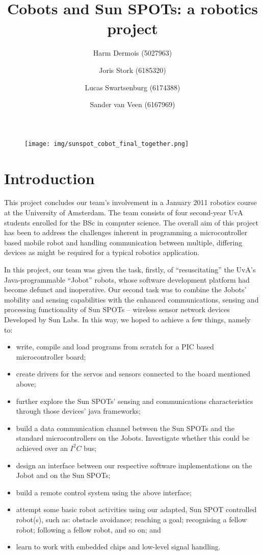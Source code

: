 \documentclass[a4paper,10pt]{article} %
\author{Harm Dermois (5027963) \and Joris Stork (6185320) \and
Lucas Swartsenburg (6174388) \and Sander van Veen (6167969)}
\title{Cobots and Sun SPOTs: a robotics project}
\begin{document}
\maketitle

\abstract{}

\begin{figure}[H]
    \label{fig:cobot_sunspot_final}
    \centering
    \texttt{[image: img/sunspot\_cobot\_final\_together.png]}
\end{figure}

\pagebreak

\tableofcontents

\pagebreak

\section{Introduction} %

This project concludes our team's involvement in a January 2011 robotics course
at the University of Amsterdam. The team consists of four second-year UvA
students enrolled for the BSc in computer science. The overall aim of this
project has been to address the challenges inherent in programming a
microcontroller based mobile robot and handling communication between multiple,
differing devices as might be required for a typical robotics application.

In this project, our team was given the task, firstly, of ``resuscitating'' the
UvA's Java-programmable ``Jobot'' robots, whose software development platform
had become defunct and inoperative. Our second task was to combine the Jobots'
mobility and sensing capabilities with the enhanced communications, sensing and
processing functionality of Sun SPOTs -- wireless sensor network devices
Developed by Sun Labs. In this way, we hoped to achieve a few things, namely to:

\begin{itemize}
    \item write, compile and load programs from scratch for a PIC based
    microcontroller board;
    \item create drivers for the servos and sensors connected to the board
    mentioned above;
    \item further explore the Sun SPOTs' sensing and communications
    characteristics through those devices' java frameworks;
    \item build a data communication channel between the Sun SPOTs and the
    standard microcontrollers on the Jobots. Investigate whether this could be
    achieved over an $I^2C$ bus;
    \item design an interface between our respective software implementations on
    the Jobot and on the Sun SPOTs;
    \item build a remote control system using the above interface;
    \item attempt some basic robot activities using our adapted, Sun SPOT
    controlled robot(s), such as: obstacle avoidance; reaching a goal;
    recognising a fellow robot; following a fellow robot, and so on; and
    \item learn to work with embedded chips and low-level signal handling.
\end{itemize}
\end{document}
